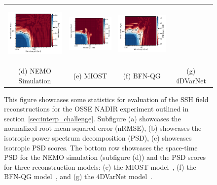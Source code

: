 \begin{figure}[H]
\begin{center}
{\begin{tabular}{cccc}
\includegraphics[trim={20mm 0 34mm 0},clip, width=2.9cm,height=3cm]{00_Oceanbench/content/figures/psd_spacetime/dc20a/nadir4/dc20a_psd_spacetime_score_miost_nadir4_ssh.png} &
\includegraphics[trim={20mm 0 34mm 0},clip, width=2.9cm,height=3cm]{00_Oceanbench/content/figures/psd_spacetime/dc20a/nadir4/dc20a_psd_spacetime_score_bfnqg_nadir4_ssh.png} &
\includegraphics[trim={20mm 0 0 0},clip, width=3.5cm,height=3cm]{00_Oceanbench/content/figures/psd_spacetime/dc20a/nadir4/dc20a_psd_spacetime_score_4dvarnet_nadir4_ssh.png} \\
(d) NEMO Simulation &
(e) MIOST &
(f) BFN-QG &
(g) 4DVarNet
\end{tabular}}
\caption{This figure showcases some statistics for evaluation of the SSH field reconstructions for the OSSE NADIR experiment outlined in section~\ref{sec:interp_challenge}. Subfigure (a) showcases the normalized root mean squared error (nRMSE), (b) showcases the isotropic power spectrum decomposition (PSD), (c) showcases isotropic PSD scores.
The bottom row showcases the space-time PSD for the NEMO simulation (subfigure (d)) and the PSD scores for three reconstruction models: (e) the MIOST model~\cite{MIOST}, (f) the BFN-QG model~\cite{BFNQG}, and (g) the 4DVarNet model~\cite{4DVARNETSWOT}.
}
\label{fig:oceanbench_psd}
\end{center}
\end{figure}


